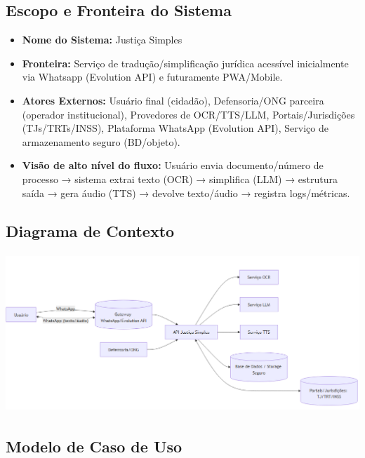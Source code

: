 \documentclass{article}
\begin{document}
\subsection{Escopo e Fronteira do Sistema}
\begin{itemize}
    \item \textbf{Nome do Sistema:} Justiça Simples
    \item \textbf{Fronteira:} Serviço de tradução/simplificação jurídica acessível inicialmente via Whatsapp (Evolution API) e futuramente PWA/Mobile.
    \item \textbf{Atores Externos:} Usuário final (cidadão), Defensoria/ONG parceira (operador institucional), Provedores de OCR/TTS/LLM, Portais/Jurisdições (TJs/TRTs/INSS), Plataforma WhatsApp (Evolution API), Serviço de armazenamento seguro (BD/objeto).
    \item \textbf{Visão de alto nível do fluxo:} Usuário envia documento/número de processo → sistema extrai texto (OCR) → simplifica (LLM) → estrutura saída → gera áudio (TTS) → devolve texto/áudio → registra logs/métricas.
\end{itemize}
\subsection{Diagrama de Contexto}
\includegraphics[width=2\textwidth,height=6cm,keepaspectratio]{images/486130606-99068cfc-9977-4b36-b273-cd742f36880f.png}
\newpage
\subsection{Modelo de Caso de Uso}
\end{document}
